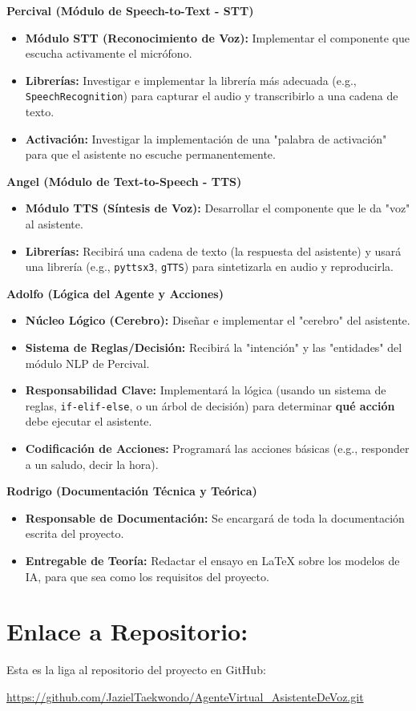 \documentclass[a4paper,12pt]{article}
\begin{document}
\textbf{Percival (Módulo de Speech-to-Text - STT)}
\begin{itemize}
    \item \textbf{Módulo STT (Reconocimiento de Voz):} Implementar el componente que escucha activamente el micrófono.
    \item \textbf{Librerías:} Investigar e implementar la librería más adecuada (e.g., \texttt{SpeechRecognition}) para capturar el audio y transcribirlo a una cadena de texto.
    \item \textbf{Activación:} Investigar la implementación de una "palabra de activación" para que el asistente no escuche permanentemente.
\end{itemize}

\textbf{Angel (Módulo de Text-to-Speech - TTS)}
\begin{itemize}
    \item \textbf{Módulo TTS (Síntesis de Voz):} Desarrollar el componente que le da "voz" al asistente.
    \item \textbf{Librerías:} Recibirá una cadena de texto (la respuesta del asistente) y usará una librería (e.g., \texttt{pyttsx3}, \texttt{gTTS}) para sintetizarla en audio y reproducirla.
\end{itemize}

\textbf{Adolfo (Lógica del Agente y Acciones)}
\begin{itemize}
    \item \textbf{Núcleo Lógico (Cerebro):} Diseñar e implementar el "cerebro" del asistente.
    \item \textbf{Sistema de Reglas/Decisión:} Recibirá la "intención" y las "entidades" del módulo NLP de Percival.
    \item \textbf{Responsabilidad Clave:} Implementará la lógica (usando un sistema de reglas, \texttt{if-elif-else}, o un árbol de decisión) para determinar \textbf{qué acción} debe ejecutar el asistente.
    \item \textbf{Codificación de Acciones:} Programará las acciones básicas (e.g., responder a un saludo, decir la hora).
\end{itemize}

\textbf{Rodrigo (Documentación Técnica y Teórica)}
\begin{itemize}
    \item \textbf{Responsable de Documentación:} Se encargará de toda la documentación escrita del proyecto.
    \item \textbf{Entregable de Teoría:} Redactar el ensayo en LaTeX sobre los modelos de IA, para que sea como los requisitos del proyecto.

\end{itemize}

\section{Enlace a Repositorio:}
Esta es la liga al repositorio del proyecto en GitHub:

\url{https://github.com/JazielTaekwondo/AgenteVirtual_AsistenteDeVoz.git}
\end{document}
